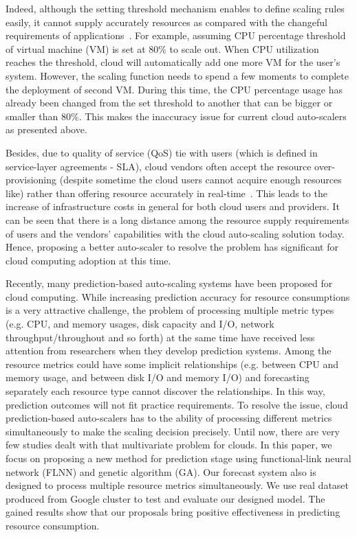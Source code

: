 \documentclass[conference]{IEEEtran}
\begin{document}
Indeed, although the setting threshold mechanism enables to define scaling rules easily, it cannot supply accurately resources as compared with the changeful requirements of applications~\cite{ref_cluser}. For example, assuming CPU percentage threshold of virtual machine (VM) is set at 80\% to scale out. When CPU utilization reaches the threshold, cloud will automatically add one more VM for the user’s system. However, the scaling function needs to spend a few moments to complete the deployment of second VM. During this time, the CPU percentage usage has already been changed from the set threshold to another that can be bigger or smaller than 80\%. This makes the inaccuracy issue for current cloud auto-scalers as presented above.

Besides, due to quality of service (QoS) tie with users (which is defined in service-layer agreements - SLA), cloud vendors often accept the resource over-provisioning (despite sometime the cloud users cannot acquire enough resources like) rather than offering resource accurately in real-time~\cite{ref_hpc}. This leads to the increase of infrastructure costs in general for both cloud users and providers. It can be seen that there is a long distance among the resource supply requirements of users and the vendors' capabilities with the cloud auto-scaling solution today. Hence, proposing a better auto-scaler to resolve the problem has significant for cloud computing adoption at this time.  

Recently, many prediction-based auto-scaling systems have been proposed for cloud computing. While increasing prediction accuracy for resource consumptions is a very attractive challenge, the problem of processing multiple metric types (e.g. CPU, and memory usages, disk capacity and I/O, network throughput/throughout and so forth) at the same time have received less attention from researchers when they develop prediction systems. Among the resource metrics could have some implicit relationships (e.g. between CPU and memory usage, and between disk I/O and memory I/O) and forecasting separately each resource type cannot discover the relationships. In this way, prediction outcomes will not fit practice requirements. To resolve the issue, cloud prediction-based auto-scalers has to the ability of processing different metrics simultaneously to make the scaling decision precisely. Until now, there are very few studies dealt with that multivariate problem for clouds. In this paper, we focus on proposing a new method for prediction stage using functional-link neural network (FLNN) and genetic algorithm (GA). Our forecast system also is designed to process multiple resource metrics simultaneously. We use real dataset produced from Google cluster to test and evaluate our designed model. The gained results show that our proposals bring positive effectiveness in predicting resource consumption.
\end{document}

